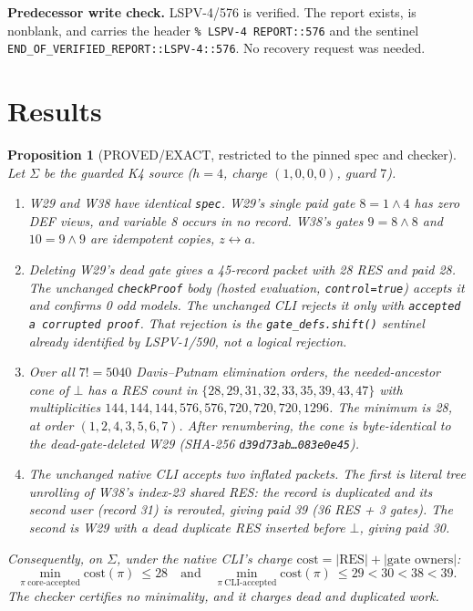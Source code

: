 \documentclass[11pt]{article}
\newtheorem{proposition}{Proposition}
\begin{document}
\textbf{Predecessor write check.} LSPV-4/576 is verified. The report exists, is
nonblank, and carries the header \texttt{\% LSPV-4 REPORT::576} and the sentinel
\texttt{END\_OF\_VERIFIED\_REPORT::LSPV-4::576}. No recovery request was needed.

\section{Results}
\begin{proposition}[PROVED/EXACT, restricted to the pinned spec and checker]
Let $\Sigma$ be the guarded K4 source ($h=4$, charge $(1,0,0,0)$, guard $7$).
\begin{enumerate}
\item W29 and W38 have identical \texttt{spec}.
W29's single paid gate $8=1\wedge4$ has zero DEF views, and variable 8 occurs in no
record.
W38's gates $9=8\wedge8$ and $10=9\wedge9$ are idempotent copies, $z\leftrightarrow a$.
\item Deleting W29's dead gate gives a 45-record packet with 28 RES and paid 28.
The unchanged \texttt{checkProof} body (hosted evaluation, \texttt{control=true}) accepts
it and confirms 0 odd models.
The unchanged CLI rejects it only with \texttt{accepted a corrupted proof}.
That rejection is the \texttt{gate\_defs.shift()} sentinel already identified by
LSPV-1/590, not a logical rejection.
\item Over all $7!=5040$ Davis--Putnam elimination orders, the needed-ancestor cone of
$\bot$ has a RES count in $\{28,29,31,32,33,35,39,43,47\}$ with multiplicities
$144,144,144,576,576,720,720,720,1296$.
The minimum is 28, at order $(1,2,4,3,5,6,7)$.
After renumbering, the cone is byte-identical to the dead-gate-deleted W29
(SHA-256 \texttt{d39d73ab\ldots083e0e45}).
\item The unchanged native CLI \emph{accepts} two inflated packets.
The first is literal tree unrolling of W38's index-23 shared RES: the record is duplicated
and its second user (record 31) is rerouted, giving paid 39 (36 RES + 3 gates).
The second is W29 with a dead duplicate RES inserted before $\bot$, giving paid 30.
\end{enumerate}
Consequently, on $\Sigma$, under the native CLI's charge
$\mathrm{cost}=|\mathrm{RES}|+|\text{gate owners}|$:
\[
\min_{\pi\ \text{core-accepted}}\mathrm{cost}(\pi)\ \le 28
\quad\text{and}\quad
\min_{\pi\ \text{CLI-accepted}}\mathrm{cost}(\pi)\ \le 29 < 30 < 38 < 39 .
\]
The checker certifies no minimality, and it charges dead and duplicated work.
\end{proposition}
\end{document}

